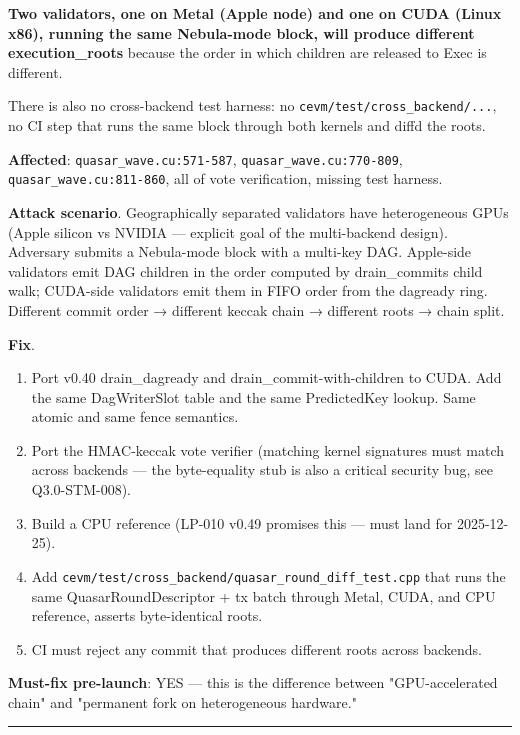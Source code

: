 \documentclass[
]{article}
\providecommand{\tightlist}{%
  \setlength{\itemsep}{0pt}\setlength{\parskip}{0pt}}
\begin{document}
\textbf{Two validators, one on Metal (Apple node) and one on CUDA (Linux
x86), running the same Nebula-mode block, will produce different
execution\_roots} because the order in which children are released to
Exec is different.

There is also no cross-backend test harness: no
\texttt{cevm/test/cross\_backend/...}, no CI step that runs the same
block through both kernels and diff\textquotesingle d the roots.

\textbf{Affected}: \texttt{quasar\_wave.cu:571-587},
\texttt{quasar\_wave.cu:770-809}, \texttt{quasar\_wave.cu:811-860}, all
of vote verification, missing test harness.

\textbf{Attack scenario}. Geographically separated validators have
heterogeneous GPUs (Apple silicon vs NVIDIA --- explicit goal of the
multi-backend design). Adversary submits a Nebula-mode block with a
multi-key DAG. Apple-side validators emit DAG children in the order
computed by drain\_commit\textquotesingle s child walk; CUDA-side
validators emit them in FIFO order from the dagready ring. Different
commit order → different keccak chain → different roots → chain split.

\textbf{Fix}.

\begin{enumerate}
\def\labelenumi{\arabic{enumi}.}
\tightlist
\item
  Port v0.40 drain\_dagready and drain\_commit-with-children to CUDA.
  Add the same DagWriterSlot table and the same PredictedKey lookup.
  Same atomic and same fence semantics.
\item
  Port the HMAC-keccak vote verifier (matching kernel signatures must
  match across backends --- the byte-equality stub is also a critical
  security bug, see Q3.0-STM-008).
\item
  Build a CPU reference (LP-010 v0.49 promises this --- must land for
  2025-12-25).
\item
  Add \texttt{cevm/test/cross\_backend/quasar\_round\_diff\_test.cpp}
  that runs the same QuasarRoundDescriptor + tx batch through Metal,
  CUDA, and CPU reference, asserts byte-identical roots.
\item
  CI must reject any commit that produces different roots across
  backends.
\end{enumerate}

\textbf{Must-fix pre-launch}: YES --- this is the difference between
"GPU-accelerated chain" and "permanent fork on heterogeneous hardware."

\begin{center}\rule{0.5\linewidth}{0.5pt}\end{center}
\end{document}
